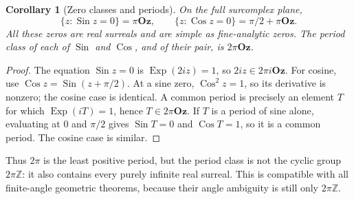 \documentclass[11pt,letterpaper]{article}
\newtheorem{corollary}[theorem]{Corollary}
\theoremstyle{definition}
\theoremstyle{remark}
\newcommand{\Oz}{\mathbf{Oz}}
\newcommand{\Z}{\mathbb Z}\newcommand{\N}{\mathbb N}
\newcommand{\Sin}{\operatorname{Sin}}
\newcommand{\Cos}{\operatorname{Cos}}
\newcommand{\Exp}{\operatorname{Exp}}
\numberwithin{equation}{section}
\begin{document}
\begin{corollary}[Zero classes and periods]\label{cor:globalzeros}
On the full surcomplex plane,
\[
 \{z:\Sin z=0\}=\pi\Oz,\qquad
 \{z:\Cos z=0\}=\pi/2+\pi\Oz.
\]
All these zeros are real surreals and are simple as fine-analytic zeros. The period class of each of $\Sin$ and $\Cos$, and of their pair, is $2\pi\Oz$.
\end{corollary}
\begin{proof}
The equation $\Sin z=0$ is $\Exp(2iz)=1$, so $2iz\in2\pi i\Oz$. For cosine, use $\Cos z=\Sin(z+\pi/2)$. At a sine zero, $\Cos^2z=1$, so its derivative is nonzero; the cosine case is identical. A common period is precisely an element $T$ for which $\Exp(iT)=1$, hence $T\in2\pi\Oz$. If $T$ is a period of sine alone, evaluating at $0$ and $\pi/2$ gives $\Sin T=0$ and $\Cos T=1$, so it is a common period. The cosine case is similar.
\end{proof}
Thus $2\pi$ is the least positive period, but the period class is not the cyclic group $2\pi\Z$: it also contains every purely infinite real surreal. This is compatible with all finite-angle geometric theorems, because their angle ambiguity is still only $2\pi\Z$.
\end{document}
